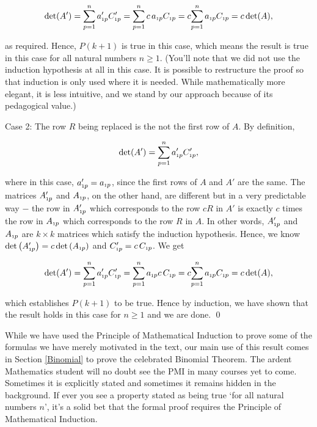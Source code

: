 \begin{ex}
\begin{enumerate}
\[ \det(A') = \displaystyle{\sum_{p=1}^{n} a'_{\mbox{\tiny$1$}p} C'_{\mbox{\tiny$1$}p}} = \displaystyle{\sum_{p=1}^{n} c \, a_{\mbox{\tiny$1$}p} C_{\mbox{\tiny$1$}p}} = c \displaystyle{\sum_{p=1}^{n} a_{\mbox{\tiny$1$}p} C_{\mbox{\tiny$1$}p}} = c \det(A), \]

as required.  Hence, $P(k+1)$ is true in this case, which means the result is true in this case for all natural numbers $n \geq 1$. (You'll note that we did not use the induction hypothesis at all in this case.  It is possible to restructure the proof so that induction is only used where it is needed.  While mathematically more elegant, it is less intuitive, and we stand by our approach because of its pedagogical value.)

{\sc Case 2:} The row $R$ being replaced is the not the first row of $A$.  By definition,

\[ \det(A') = \displaystyle{\sum_{p=1}^{n} a'_{\mbox{\tiny$1$}p} C'_{\mbox{\tiny$1$}p}},\]

where in this case, $a'_{\mbox{\tiny$1$}p} = a_{\mbox{\tiny$1$}p}$, since the first rows of $A$ and $A'$ are the same. The matrices $A'_{\mbox{\tiny$1$}p}$ and $A_{\mbox{\tiny$1$}p}$, on the other hand, are different but in a very predictable way $-$ the row in $A'_{\mbox{\tiny$1$}p}$ which corresponds to the row $cR$ in $A'$ is exactly $c$ times the row in $A_{\mbox{\tiny$1$}p}$ which corresponds to the row $R$ in $A$.  In other words, $A'_{\mbox{\tiny$1$}p}$ and $A_{\mbox{\tiny$1$}p}$ are $k \times k$ matrices which satisfy the induction hypothesis.  Hence, we know $\det\left(A'_{\mbox{\tiny$1$}p}\right) = c \det\left(A_{\mbox{\tiny$1$}p}\right)$ and $C'_{\mbox{\tiny$1$}p} = c \, C_{\mbox{\tiny$1$}p}$.  We get

\[ \det(A') = \displaystyle{\sum_{p=1}^{n} a'_{\mbox{\tiny$1$}p} C'_{\mbox{\tiny$1$}p}} = \displaystyle{\sum_{p=1}^{n} a_{\mbox{\tiny$1$}p} c\, C_{\mbox{\tiny$1$}p}} = c \displaystyle{\sum_{p=1}^{n} a_{\mbox{\tiny$1$}p} C_{\mbox{\tiny$1$}p}} = c \det(A), \]

which establishes $P(k+1)$ to be true.  Hence by induction, we have shown that the result holds in this case for $n \geq 1$ and we are done.  \qed

\end{enumerate}

\end{ex}

While we have used the Principle of Mathematical Induction to prove some of the formulas we have merely motivated in the text, our main use of this result comes in Section \ref{Binomial} to prove the celebrated Binomial Theorem.  The ardent Mathematics student will no doubt see the PMI in many courses yet to come.  Sometimes it is explicitly stated and sometimes it remains hidden in the background.  If ever you see a property stated as being true `for all natural numbers $n$', it's a solid bet that the formal proof requires the Principle of Mathematical Induction.

